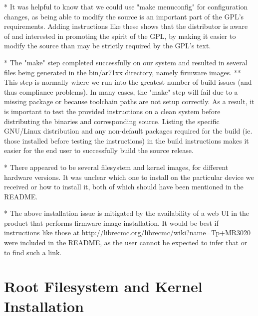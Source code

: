 * It was helpful to know that we could use "make menuconfig" for configuration
  changes, as being able to modify the source is an important part of the GPL's
  requirements.  Adding instructions like these shows that the distributor is
  aware of and interested in promoting the spirit of the GPL, by making it
  easier to modify the source than may be strictly required by the GPL's text.

  
* The "make" step completed successfully on our system and resulted in several
  files being generated in the bin/ar71xx directory, namely firmware images.
** This step is normally where we run into the greatest number of build issues
   (and thus compliance problems).  In many cases, the "make" step will fail due
   to a missing package or because toolchain paths are not setup correctly.  As
   a result, it is important to test the provided instructions on a clean system
   before distributing the binaries and corresponding source.  Listing the
   specific GNU/Linux distribution and any non-default packages required for the
   build (ie. those installed before testing the instructions) in the build
   instructions makes it easier for the end user to successfully build the
   source release.

* There appeared to be several filesystem and kernel images, for different
  hardware versions.  It was unclear which one to install on the particular
  device we received or how to install it, both of which should have been
  mentioned in the README.

  
* The above installation issue is mitigated by the availability of a web UI in
  the product that performs firmware image installation.  It would be best if
  instructions like those at http://librecmc.org/librecmc/wiki?name=Tp+MR3020
  were included in the README, as the user cannot be expected to infer that or
  to find such a link.

\section{Root Filesystem and Kernel Installation}

